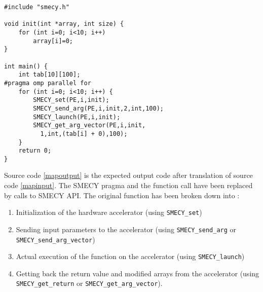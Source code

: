 \documentclass [A4]{article}
\begin{document}
	\begin{lstlisting}[label=mapoutput,caption={Expected output code}]
#include "smecy.h"

void init(int *array, int size) {
	for (int i=0; i<10; i++)
		array[i]=0;
}

int main() {
	int tab[10][100];
#pragma omp parallel for
	for (int i=0; i<10; i++) {
		SMECY_set(PE,i,init);
		SMECY_send_arg(PE,i,init,2,int,100);
		SMECY_launch(PE,i,init);
		SMECY_get_arg_vector(PE,i,init,
		  1,int,(tab[i] + 0),100);
	}
	return 0;
}
	\end{lstlisting}
	Source code \ref{mapoutput} is the expected output code after translation of source code \ref{mapinput}. The SMECY pragma and the function call have been replaced by calls to SMECY API. The original function has been broken down into :
	\begin{enumerate}
		\item Initialization of the hardware accelerator (using \verb+SMECY_set+)
		\item Sending input parameters to the accelerator (using \verb+SMECY_send_arg+ or \verb+SMECY_send_arg_vector+)
		\item Actual execution of the function on the accelerator (using \verb+SMECY_launch+)
		\item Getting back the return value and modified arrays from the accelerator (using \verb+SMECY_get_return+ or \verb+SMECY_get_arg_vector+).
	\end{enumerate}
	
\end{document}
